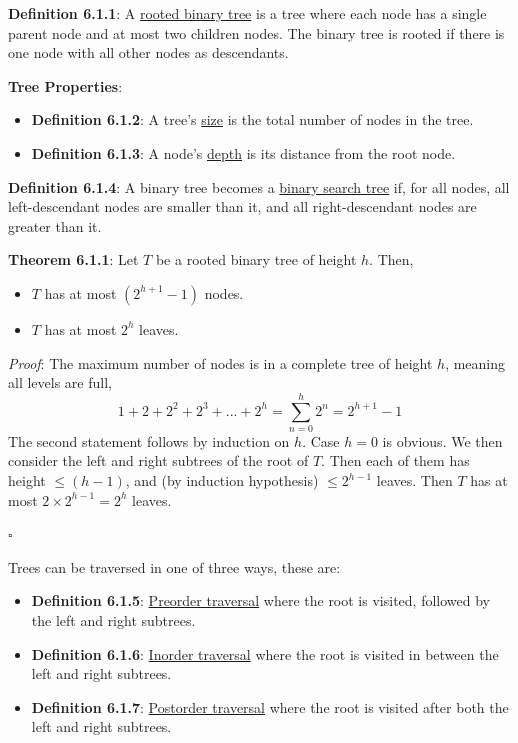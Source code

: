 \documentclass{article}
\newcommand{\separate}[1] {\vspace{#1 pt}\noindent}
\newcommand{\definition}[2]{\textbf{Definition #1}: #2\label{def:#1}}
\newcommand{\proof}[2]{\textit{Proof}: #2 \begin{flushright}\(\square\)\end{flushright}\label{prf:#1}}
\newcommand{\theorem}[3]{\textbf{Theorem #1}: #2 \par\separate{3}\proof{thm:#1}{#3}\label{thm:#1}}
\begin{document}
\definition{6.1.1}{A \underline{rooted binary tree} is a tree where each node has a single parent node and at most two children nodes. The binary tree is rooted if there is one node with all other nodes as descendants.}

\separate{7}\textbf{Tree Properties}:
\begin{itemize}
    \item \definition{6.1.2}{A tree's \underline{size} is the total number of nodes in the tree.}
    \item \definition{6.1.3}{A node's \underline{depth} is its distance from the root node.}
\end{itemize}

\separate{7}\definition{6.1.4}{A binary tree becomes a \underline{binary search tree} if, for all nodes, all left-descendant nodes are smaller than it, and all right-descendant nodes are greater than it.}

\newpage\noindent\theorem{6.1.1}{Let \(T\) be a rooted binary tree of height \(h\). Then,
\begin{itemize}
    \item \(T\) has at most \(\left(2^{h+1}-1\right)\) nodes.
    \item \(T\) has at most \(2^h\) leaves.
\end{itemize}}
{The maximum number of nodes is in a complete tree of height \(h\), meaning all levels are full,
\begin{equation}
    1 + 2 + 2^2 + 2^3 + ... + 2^h 
    = \sum^h_{n=0} 2^n 
    = 2^{h+1} - 1
\end{equation}
The second statement follows by induction on \(h\). Case \(h=0\) is obvious. We then consider the left and right subtrees of the root of \(T\).
Then each of them has height \(\leq (h-1)\), and (by induction hypothesis) \(\leq 2^{h-1}\) leaves. Then \(T\) has at most \(2 \times 2^{h-1} = 2^h\) leaves.}

\separate{7}Trees can be traversed in one of three ways, these are:
\begin{itemize}
    \item \definition{6.1.5}{\underline{Preorder traversal} where the root is visited, followed by the left and right subtrees.}
    \item \definition{6.1.6}{\underline{Inorder traversal} where the root is visited in between the left and right subtrees.}
    \item \definition{6.1.7}{\underline{Postorder traversal} where the root is visited after both the left and right subtrees.}
\end{itemize}
\end{document}
